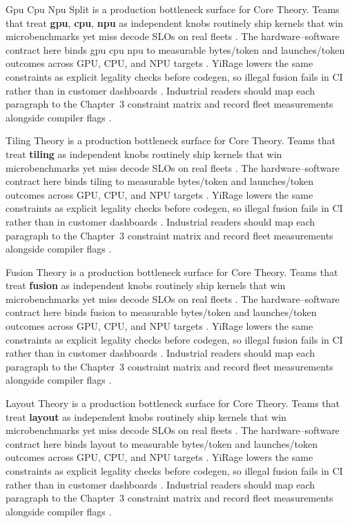 Gpu Cpu Npu Split is a production bottleneck surface for Core Theory. Teams that treat \textbf{gpu}, \textbf{cpu}, \textbf{npu} as independent knobs routinely ship kernels that win microbenchmarks yet miss decode SLOs on real fleets \citep{memoryfloor2026,amd2024xdna}. The hardware--software contract here binds gpu cpu npu to measurable bytes/token and launches/token outcomes across GPU, CPU, and NPU targets \citep{nvidia2022hopper,amd2024aie}. YiRage lowers the same constraints as explicit legality checks before codegen, so illegal fusion fails in CI rather than in customer dashboards \citep{semianalysis2024tma,dlbook}. Industrial readers should map each paragraph to the Chapter~3 constraint matrix and record fleet measurements alongside compiler flags \citep{amd2024xdna,dao2022flashattention}.

Tiling Theory is a production bottleneck surface for Core Theory. Teams that treat \textbf{tiling} as independent knobs routinely ship kernels that win microbenchmarks yet miss decode SLOs on real fleets \citep{nvidia2022hopper,amd2024aie}. The hardware--software contract here binds tiling to measurable bytes/token and launches/token outcomes across GPU, CPU, and NPU targets \citep{semianalysis2024tma,dlbook}. YiRage lowers the same constraints as explicit legality checks before codegen, so illegal fusion fails in CI rather than in customer dashboards \citep{amd2024xdna,dao2022flashattention}. Industrial readers should map each paragraph to the Chapter~3 constraint matrix and record fleet measurements alongside compiler flags \citep{amd2024aie,kwon2023vllm}.

Fusion Theory is a production bottleneck surface for Core Theory. Teams that treat \textbf{fusion} as independent knobs routinely ship kernels that win microbenchmarks yet miss decode SLOs on real fleets \citep{semianalysis2024tma,dlbook}. The hardware--software contract here binds fusion to measurable bytes/token and launches/token outcomes across GPU, CPU, and NPU targets \citep{amd2024xdna,dao2022flashattention}. YiRage lowers the same constraints as explicit legality checks before codegen, so illegal fusion fails in CI rather than in customer dashboards \citep{amd2024aie,kwon2023vllm}. Industrial readers should map each paragraph to the Chapter~3 constraint matrix and record fleet measurements alongside compiler flags \citep{dlbook,nvidia2024cudagraphs}.

Layout Theory is a production bottleneck surface for Core Theory. Teams that treat \textbf{layout} as independent knobs routinely ship kernels that win microbenchmarks yet miss decode SLOs on real fleets \citep{amd2024xdna,dao2022flashattention}. The hardware--software contract here binds layout to measurable bytes/token and launches/token outcomes across GPU, CPU, and NPU targets \citep{amd2024aie,kwon2023vllm}. YiRage lowers the same constraints as explicit legality checks before codegen, so illegal fusion fails in CI rather than in customer dashboards \citep{dlbook,nvidia2024cudagraphs}. Industrial readers should map each paragraph to the Chapter~3 constraint matrix and record fleet measurements alongside compiler flags \citep{dao2022flashattention,liu2024deepseekv3}.

